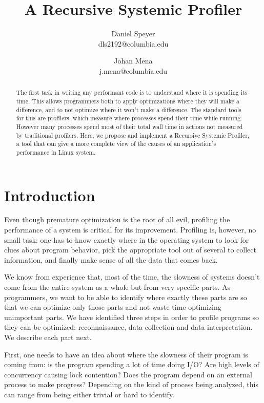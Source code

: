 \documentclass[10pt]{article}
\begin{document}
\author{Daniel Speyer\\dls2192@columbia.edu \and Johan Mena\\j.mena@columbia.edu}
\title{A Recursive Systemic Profiler}

\twocolumn[
\begin{@twocolumnfalse}
\maketitle

\end{@twocolumnfalse}
]

\begin{abstract}
The first task in writing any performant code is to understand where it is spending its time. This allows programmers both to apply optimizations where they will make a difference, and to not optimize where it won't make a difference. The standard tools for this are profilers, which measure where processes spend their time while running. However many processes spend most of their total wall time in actions not measured by traditional profilers. Here, we propose and implement a Recursive Systemic Profiler, a tool that can give a more complete view of the causes of an application’s performance in Linux system.
\end{abstract}

\section{Introduction}
Even though premature optimization is the root of all evil, profiling the performance of a system is critical for its improvement. Profiling is, however, no small task: one has to know exactly where in the operating system to look for clues about program behavior, pick the appropriate tool out of several to collect information, and finally make sense of all the data that comes back.

We know from experience that, most of the time, the slowness of systems doesn't come from the entire system as a whole but from very specific parts. As programmers, we want to be able to identify where exactly these parts are so that we can optimize only those parts and not waste time optimizing unimportant parts. We have identified three steps in order to profile programs so they can be optimized: reconnaissance, data collection and data interpretation. We describe each part next.

First, one needs to have an idea about where the slowness of their program is coming from: is the program spending a lot of time doing I/O? Are high levels of concurrency causing lock contention? Does the program depend on an external process to make progress? Depending on the kind of process being analyzed, this can range from being either trivial or hard to identify.
\end{document}

